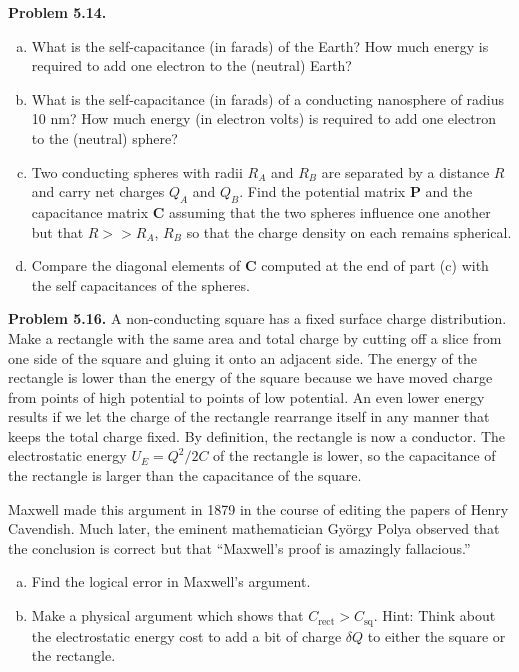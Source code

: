 \documentclass{article}
\begin{document}
\hrulefill

\textbf{Problem 5.14.}
\begin{enumerate}[(a)]
     \item What is the self-capacitance (in farads) of the Earth? How much energy is required to add one electron to the (neutral) Earth?
     \item What is the self-capacitance (in farads) of a conducting nanosphere of radius 10 nm? How much energy (in electron volts) is required to add one electron to the (neutral) sphere?
     \item Two conducting spheres with radii $R_A$ and $R_B$ are separated by a distance $R$ and carry net charges $Q_A$ and $Q_B$. Find the potential matrix $\mathbf{P}$ and the capacitance matrix $\mathbf{C}$ assuming that the two spheres influence one another but that $R >\!\!> R_A$, $R_B$ so that the charge density on each remains spherical.
     \item Compare the diagonal elements of $\mathbf{C}$ computed at the end of part (c) with the self capacitances of the spheres.
 \end{enumerate} 



\hrulefill

\textbf{Problem 5.16.} A non-conducting square has a fixed surface charge distribution. Make a rectangle with the same area and total charge by cutting off a slice from one side of the square and gluing it onto an adjacent side. The energy of the rectangle is lower than the energy of the square because we have moved charge from points of high potential to points of low potential. An even lower energy results if we let the charge of the rectangle rearrange itself in any manner that keeps the total charge fixed. By definition, the rectangle is now a conductor. The electrostatic energy $U_E = Q^2/2C$ of the rectangle is lower, so the capacitance of the rectangle is larger than the capacitance of the square.

Maxwell made this argument in 1879 in the course of editing the papers of Henry Cavendish. Much later, the eminent mathematician Gy\"{o}rgy Polya observed that the conclusion is correct but that “Maxwell’s proof is amazingly fallacious.”
\begin{enumerate}[(a)]
    \item Find the logical error in Maxwell's argument.
    \item Make a physical argument which shows that $C_{\text{rect}} > C_{\text{sq}}$. Hint: Think about the electrostatic energy cost to add a bit of charge $\delta Q$ to either the square or the rectangle.
\end{enumerate}
\end{document}
